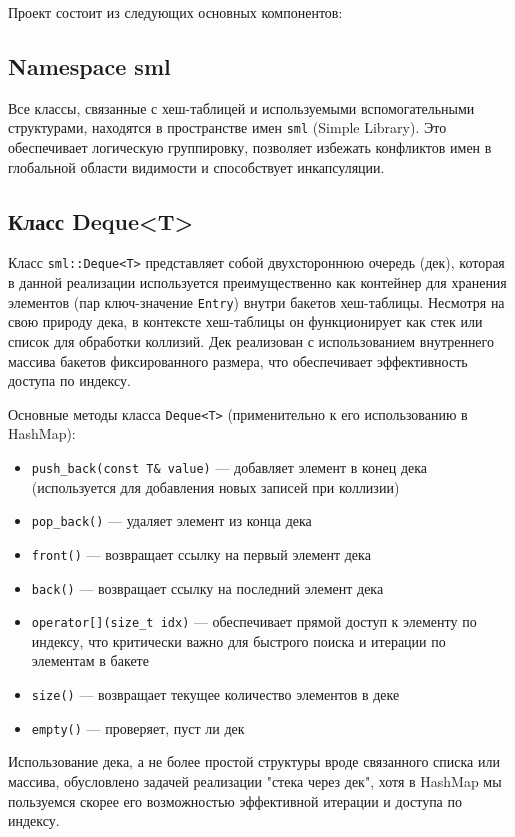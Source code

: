\documentclass[a4paper,12pt]{article}
\begin{document}
Проект состоит из следующих основных компонентов:

\subsection{Namespace sml}

Все классы, связанные с хеш-таблицей и используемыми вспомогательными структурами, находятся в пространстве имен \texttt{sml} (Simple Library). Это обеспечивает логическую группировку, позволяет избежать конфликтов имен в глобальной области видимости и способствует инкапсуляции.

\subsection{Класс Deque<T>}

Класс \texttt{sml::Deque<T>} представляет собой двухстороннюю очередь (дек), которая в данной реализации используется преимущественно как контейнер для хранения элементов (пар ключ-значение \texttt{Entry}) внутри бакетов хеш-таблицы. Несмотря на свою природу дека, в контексте хеш-таблицы он функционирует как стек или список для обработки коллизий. Дек реализован с использованием внутреннего массива бакетов фиксированного размера, что обеспечивает эффективность доступа по индексу.

Основные методы класса \texttt{Deque<T>} (применительно к его использованию в HashMap):
\begin{itemize}
    \item \texttt{push\_back(const T\& value)} --- добавляет элемент в конец дека (используется для добавления новых записей при коллизии)
    \item \texttt{pop\_back()} --- удаляет элемент из конца дека
    \item \texttt{front()} --- возвращает ссылку на первый элемент дека
    \item \texttt{back()} --- возвращает ссылку на последний элемент дека
    \item \texttt{operator[](size\_t idx)} --- обеспечивает прямой доступ к элементу по индексу, что критически важно для быстрого поиска и итерации по элементам в бакете
    \item \texttt{size()} --- возвращает текущее количество элементов в деке
    \item \texttt{empty()} --- проверяет, пуст ли дек
\end{itemize}
Использование дека, а не более простой структуры вроде связанного списка или массива, обусловлено задачей реализации "стека через дек", хотя в HashMap мы пользуемся скорее его возможностью эффективной итерации и доступа по индексу.
\end{document}
